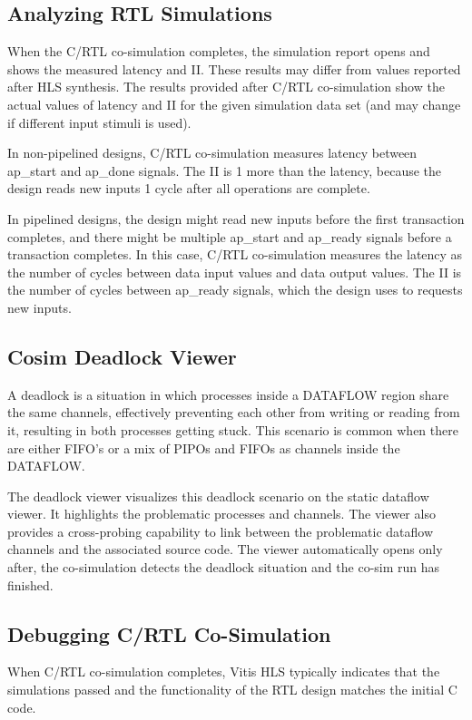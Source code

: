 \subsection{Analyzing RTL Simulations}
When the C/RTL co-simulation completes, the simulation report opens and  shows the measured latency and II. These results may differ from values reported after HLS synthesis. The results provided after C/RTL co-simulation show the actual values of latency and II for the given simulation data set (and may change if different input stimuli is used).

\par In non-pipelined designs, C/RTL co-simulation measures latency between ap\_start and ap\_done signals. The II is 1 more than the latency, because the design reads new inputs 1 cycle after all operations are complete.

\par In pipelined designs, the design might read new inputs before the first transaction completes, and there might be multiple ap\_start and ap\_ready signals before a transaction completes. In this case, C/RTL co-simulation measures the latency as the number of cycles between data input values and data output values. The II is the number of cycles between ap\_ready signals, which the design uses to requests new inputs.

\subsection{Cosim Deadlock Viewer}
A deadlock is a situation in which processes inside a DATAFLOW region share the same channels, effectively preventing each other from writing or reading from it, resulting in both processes getting stuck. This scenario is common when there are either FIFO's or a mix of PIPOs and FIFOs as channels inside the DATAFLOW.

\par The deadlock viewer visualizes this deadlock scenario on the static dataflow viewer. It highlights the problematic processes and channels. The viewer also provides a cross-probing capability to link between the problematic dataflow channels and the associated source code. The viewer automatically opens only after, the co-simulation detects the deadlock situation and the co-sim run has finished.

\subsection{Debugging C/RTL Co-Simulation}
When C/RTL co-simulation completes, Vitis HLS typically indicates that the simulations passed and the functionality of the RTL design matches the initial C code. 


